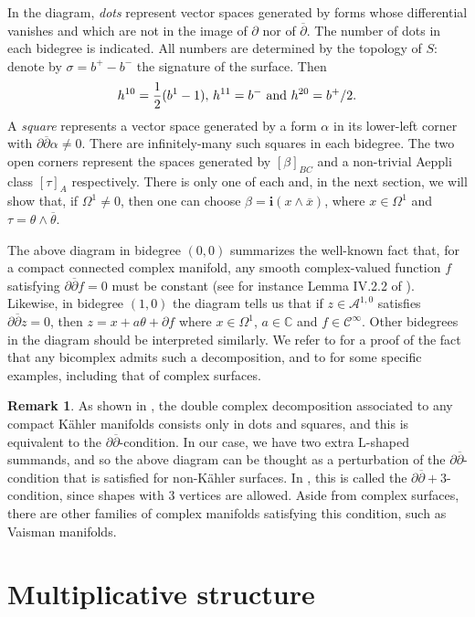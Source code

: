 \documentclass[a4paper]{amsart}
\theoremstyle{definition}
\newtheorem{rema}[theo]{Remark}
\newcommand{\CC}{\mathbb{C}}
\newcommand{\Aa}{\mathcal{A}}
\newcommand{\Cc}{\mathcal{C}}
\newcommand{\ov}{\overline}
\newcommand{\del}{\partial}
\newcommand{\delb}{{\overline\partial}}
\begin{document}
In the diagram, \textit{dots} represent vector spaces generated by forms whose differential vanishes and which are not in the image of $\del$ nor of $\delb$. The number of dots in each bidegree is indicated. All numbers are determined by the topology of $S$: denote by $\sigma=b^+-b^-$ the signature of the surface.
Then
\[h^{10}={1\over 2}(b^1-1),\,h^{11}=b^-\text{ and }h^{20}=b^+/2.\]
 A \textit{square} represents a vector space generated by a form $\alpha$ in its lower-left corner with $\del\delb \alpha\neq 0$. There are infinitely-many such squares in each bidegree. The two open corners represent the spaces generated by  $[\beta]_{BC}$ and a non-trivial Aeppli class $[\tau]_A$ respectively.
 There is only one of each and, in the next section, we will show that, if $\Omega^1\neq 0$, then one can choose $\beta=\mathbf{i}(x\wedge \ov x)$, where $x\in\Omega^1$ and $\tau=\theta\wedge\ov\theta$.

The above diagram in bidegree $(0,0)$ summarizes the well-known fact that, for a compact connected complex manifold,
any smooth complex-valued function $f$ satisfying $\del\delb f=0$ must be constant (see for instance Lemma IV.2.2 of \cite{Barth}).
Likewise, in bidegree $(1,0)$ the diagram tells us that if $z\in\Aa^{1,0}$ satisfies $\del\delb z=0$, then $z=x+a\theta+\del f$ where $x\in\Omega^1$, $a\in\CC$ and $f\in\Cc^\infty$.
Other bidegrees in the diagram should be interpreted similarly. We refer to \cite{Stelzig} for a proof of the fact that any bicomplex admits such a decomposition, and to \cite{SW} for some specific examples, including that of complex surfaces.

\begin{rema}As shown in \cite{DGMS}, the double complex decomposition associated to any compact Kähler manifolds consists only in dots and squares, and this is equivalent to the $\del\delb$-condition.
 In our case, we have two extra $\mathrm{L}$-shaped summands, and so the above diagram can be thought as a perturbation of the $\del\delb$-condition that is satisfied for non-Kähler surfaces. In \cite{SW}, this is called the $\del\delb+3$-condition, since shapes with 3 vertices are allowed. Aside from complex surfaces, there are other families of complex manifolds satisfying this condition, such as Vaisman manifolds.
\end{rema}

\section{Multiplicative structure}\label{secmulti}
\end{document}
